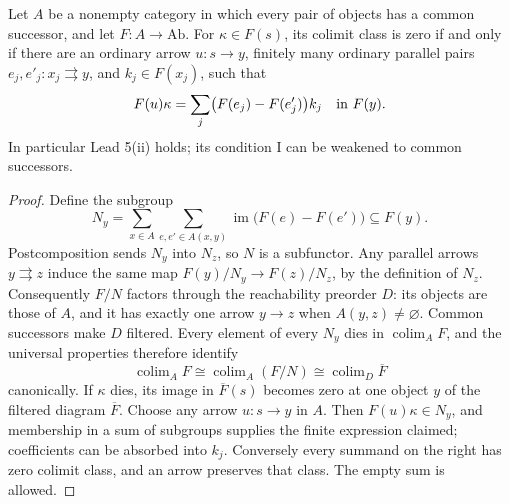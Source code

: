 \begin{lemma}
\label{B:zero-normal-form}
Let $A$ be a nonempty category in which every pair of objects has a
common successor, and let $F:A\to\mathrm{Ab}$.  For $\kappa\in F(s)$,
its colimit class is zero if and only if there are an ordinary arrow
$u:s\to y$, finitely many ordinary parallel pairs
$e_j,e'_j:x_j\rightrightarrows y$, and $k_j\in F(x_j)$, such that
\[
 F(u)\kappa=\sum_j\bigl(F(e_j)-F(e'_j)\bigr)k_j\quad\hbox{in }F(y).
\]
In particular Lead 5(ii) holds; its condition I can be weakened to
common successors.
\end{lemma}
\begin{proof}
Define the subgroup
\[
 N_y=\sum_{x\in A}\sum_{e,e'\in A(x,y)}
       \operatorname{im}\bigl(F(e)-F(e')\bigr)\subseteq F(y).
\]
Postcomposition sends $N_y$ into $N_z$, so $N$ is a subfunctor.
Any parallel arrows $y\rightrightarrows z$ induce the same map
$F(y)/N_y\to F(z)/N_z$, by the definition of $N_z$.
Consequently $F/N$ factors through the reachability preorder $D$:
its objects are those of $A$, and it has exactly one arrow $y\to z$
when $A(y,z)\ne\varnothing$.  Common successors make $D$ filtered.
Every element of every $N_y$ dies in $\operatorname{colim}_A F$,
and the universal properties therefore identify
\[
 \operatorname{colim}_A F\cong
 \operatorname{colim}_A(F/N)\cong
 \operatorname{colim}_D\overline F
\]
canonically.  If $\kappa$ dies, its image in $\overline F(s)$ becomes
zero at one object $y$ of the filtered diagram $\overline F$.
Choose any arrow $u:s\to y$ in $A$.  Then $F(u)\kappa\in N_y$,
and membership in a sum of subgroups supplies the finite expression
claimed; coefficients can be absorbed into $k_j$.  Conversely every
summand on the right has zero colimit class, and an arrow preserves
that class.  The empty sum is allowed.
\end{proof}

